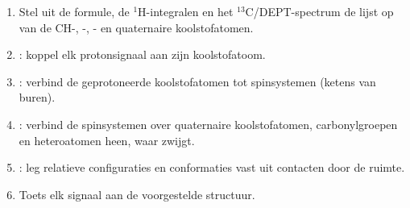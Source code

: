\begin{method}\label{met:b3:advanced-nmr:solve-2d}
\begin{enumerate}
  \item Stel uit de formule, de ${}^1$H-integralen en het
        ${}^{13}$C/DEPT-spectrum de lijst op van de CH-, -,
        - en quaternaire koolstofatomen.
  \item {}: koppel elk protonsignaal aan zijn koolstofatoom.
  \item {}: verbind de geprotoneerde koolstofatomen tot spinsystemen
        (ketens van buren).
  \item {}: verbind de spinsystemen over quaternaire koolstofatomen,
        carbonylgroepen en heteroatomen heen, waar  zwijgt.
  \item {}: leg relatieve configuraties en conformaties vast uit
        contacten door de ruimte.
  \item Toets elk signaal aan de voorgestelde structuur.
\end{enumerate}
\end{method}

